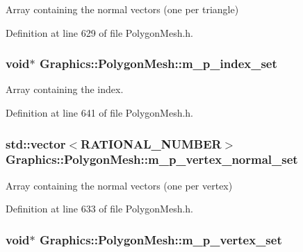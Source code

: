 Array containing the normal vectors (one per triangle) 



Definition at line 629 of file PolygonMesh.h.

\hypertarget{class_graphics_1_1_polygon_mesh_a0065f5a4a8e996c1b6da44778e978953}{
\subsubsection[{m\_\-p\_\-index\_\-set}]{\setlength{\rightskip}{0pt plus 5cm}void$\ast$ {\bf Graphics::PolygonMesh::m\_\-p\_\-index\_\-set}}}
\label{class_graphics_1_1_polygon_mesh_a0065f5a4a8e996c1b6da44778e978953}


Array containing the index. 



Definition at line 641 of file PolygonMesh.h.

\hypertarget{class_graphics_1_1_polygon_mesh_aab6df25fff511d684579ca76d026fcf2}{
\subsubsection[{m\_\-p\_\-vertex\_\-normal\_\-set}]{\setlength{\rightskip}{0pt plus 5cm}std::vector$<${\bf RATIONAL\_\-NUMBER}$>$ {\bf Graphics::PolygonMesh::m\_\-p\_\-vertex\_\-normal\_\-set}}}
\label{class_graphics_1_1_polygon_mesh_aab6df25fff511d684579ca76d026fcf2}


Array containing the normal vectors (one per vertex) 



Definition at line 633 of file PolygonMesh.h.

\hypertarget{class_graphics_1_1_polygon_mesh_ae577b2b3640a376042681a02008c6e39}{
\subsubsection[{m\_\-p\_\-vertex\_\-set}]{\setlength{\rightskip}{0pt plus 5cm}void$\ast$ {\bf Graphics::PolygonMesh::m\_\-p\_\-vertex\_\-set}}}
\label{class_graphics_1_1_polygon_mesh_ae577b2b3640a376042681a02008c6e39}


